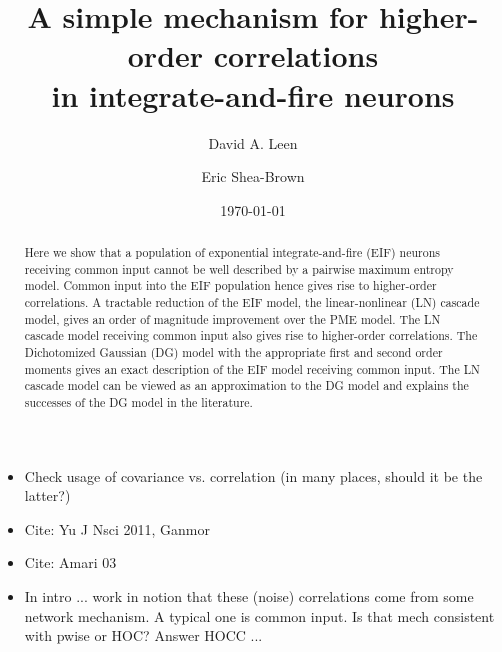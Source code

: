 \documentclass[%
 reprint,
 amsmath,amssymb,
 aps,
floatfix,
]{revtex4-1}
\begin{document}

\title{A simple mechanism for higher-order correlations\\ in integrate-and-fire neurons}%

\author{David A. Leen}

 
\author{Eric Shea-Brown}%

\date{\today}%

\begin{abstract}
Here we show that a population of exponential integrate-and-fire (EIF) neurons receiving common input cannot be well described by a pairwise maximum entropy model. Common input into the EIF population hence gives rise to higher-order correlations. A tractable reduction of the EIF model, the linear-nonlinear (LN) cascade model, gives an order of magnitude improvement over the PME model. The LN cascade model receiving common input also gives rise to higher-order correlations. The Dichotomized Gaussian (DG) model with the appropriate first and second order moments gives an exact description of the EIF model receiving common input. The LN cascade model can be viewed as an approximation to the DG model and explains the successes of the DG model in the literature.
\end{abstract}

\maketitle

\begin{itemize}
\item Check usage of covariance vs. correlation (in many places, should it be the latter?)
\item Cite:  Yu J Nsci 2011, Ganmor
\item  Cite: Amari 03
\item In intro ... work in notion that these (noise) correlations come from some network mechanism.  A typical one is common input.  Is that mech consistent with pwise or HOC?  Answer HOCC ... 
\end{itemize}
\end{document}
